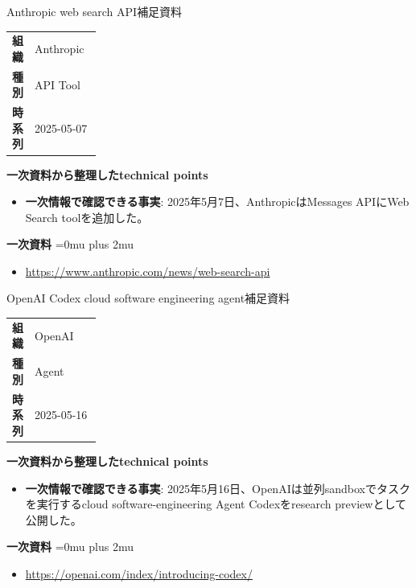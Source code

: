 \begin{technicalnote}{Anthropic web search API}{補足資料}
\begingroup
\begin{tabularx}{\linewidth}{@{}>{\bfseries}p{0.22\linewidth}X@{}}
組織 & Anthropic \\
種別 & API Tool \\
時系列 & 2025-05-07 \\
\end{tabularx}
\smallskip
{\bfseries 一次資料から整理したtechnical points}
\begin{itemize}[leftmargin=1.5em,itemsep=0.35em]
\item \textbf{一次情報で確認できる事実}: 2025年5月7日、AnthropicはMessages APIにWeb Search toolを追加した。
\end{itemize}
\begin{samepage}
{\bfseries 一次資料}
\begingroup\sloppy
\Urlmuskip=0mu plus 2mu\relax
\begin{itemize}[leftmargin=1.5em,itemsep=0.25em]
\item {\scriptsize\url{https://www.anthropic.com/news/web-search-api}}
\end{itemize}
\endgroup
\end{samepage}
\endgroup
\end{technicalnote}
\medskip

\begin{technicalnote}{OpenAI Codex cloud software engineering agent}{補足資料}
\begingroup
\begin{tabularx}{\linewidth}{@{}>{\bfseries}p{0.22\linewidth}X@{}}
組織 & OpenAI \\
種別 & Agent \\
時系列 & 2025-05-16 \\
\end{tabularx}
\smallskip
{\bfseries 一次資料から整理したtechnical points}
\begin{itemize}[leftmargin=1.5em,itemsep=0.35em]
\item \textbf{一次情報で確認できる事実}: 2025年5月16日、OpenAIは並列sandboxでタスクを実行するcloud software-engineering Agent Codexをresearch previewとして公開した。
\end{itemize}
\begin{samepage}
{\bfseries 一次資料}
\begingroup\sloppy
\Urlmuskip=0mu plus 2mu\relax
\begin{itemize}[leftmargin=1.5em,itemsep=0.25em]
\item {\scriptsize\url{https://openai.com/index/introducing-codex/}}
\end{itemize}
\endgroup
\end{samepage}
\endgroup
\end{technicalnote}
\medskip

